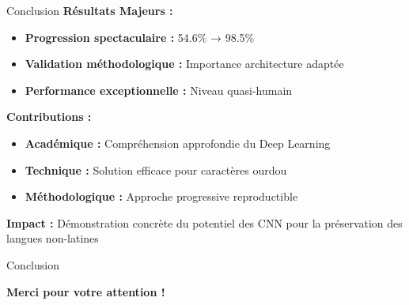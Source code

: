 \documentclass[aspectratio=169]{beamer}
\newcommand{\emphasize}[1]{\textcolor{accent_orange}{\textbf{#1}}}
\begin{document}
\begin{frame}{Conclusion}
    \textbf{Résultats Majeurs :}
    \begin{itemize}
        \item \emphasize{Progression spectaculaire :} 54.6\% → 98.5\%
        \item \emphasize{Validation méthodologique :} Importance architecture adaptée
        \item \emphasize{Performance exceptionnelle :} Niveau quasi-humain
    \end{itemize}
    
    \vspace{0.5cm}
    \textbf{Contributions :}
    \begin{itemize}
        \item \textbf{Académique :} Compréhension approfondie du Deep Learning
        \item \textbf{Technique :} Solution efficace pour caractères ourdou
        \item \textbf{Méthodologique :} Approche progressive reproductible
    \end{itemize}
    
    \vspace{0.5cm}
    \textbf{Impact :} Démonstration concrète du potentiel des CNN pour la préservation des langues non-latines
    
    
\end{frame}

\begin{frame}{Conclusion}
    \begin{center}
        \Large \textcolor{tech_green}{\textbf{Merci pour votre attention !}}
    \end{center}
\end{frame}
\end{document}
